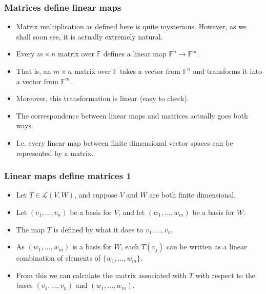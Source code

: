 \documentclass[handout]{beamer}
\newcommand{\bF}{\mathbb{F}}
\newcommand{\cL}{\mathcal{L}}
\begin{document}
\begin{frame}
\frametitle{Matrices define linear maps}
\begin{itemize}
\item Matrix multiplication as defined here is quite mysterious. However, as we shall soon see, it is actually extremely natural.\vspace{0.3cm}
\item Every $m\times n$ matrix over $\bF$ defines a linear map $\bF^n\to\bF^m$. \vspace{0.3cm}
\item That is, an $m\times n$ matrix over $\bF$ takes a vector from $\bF^n$ and transforms it into a vector from $\bF^m$. \vspace{0.3cm}
\item Moreover, this transformation is linear (easy to check). \vspace{0.3cm}
\item The correspondence between linear maps and matrices actually goes both ways.\vspace{0.3cm}
\item I.e. every linear map between finite dimensional vector spaces can be represented by a matrix. 
\end{itemize}
\end{frame}

\begin{frame}
\frametitle{Linear maps define matrices 1}
\begin{itemize}
\item Let $T\in \cL(V,W)$, and suppose $V$ and $W$ are both finite dimensional.\vspace{0.4cm}
\item Let $(v_1,\ldots,v_n)$ be a basis for $V$, and let $(w_1,\ldots,w_m)$ be a basis for $W$.\vspace{0.4cm}
\item The map $T$ is defined by what it does to $v_1,\ldots,v_n$.\vspace{0.4cm}
\item As $(w_1,\ldots,w_m)$ is a basis for $W$, each $T(v_j)$ can be written as a linear combination of elements of $\{w_1,\ldots,w_m\}$. \vspace{0.4cm}
\item From this we can calculate the matrix associated with $T$ with respect to the bases $(v_1,\ldots,v_n)$ and $(w_1,\ldots,w_m)$. 
\end{itemize}
\end{frame}
\end{document}
